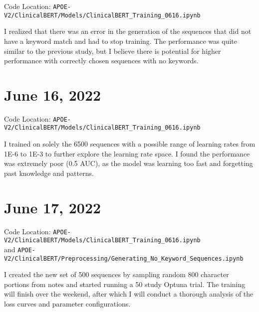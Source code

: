 \documentclass[11pt,letterpaper]{article}
\begin{document}
Code Location: \texttt{APOE-V2/ClinicalBERT/Models/ClinicalBERT\_Training\_0616.ipynb}

I realized that there was an error in the generation of the sequences that did not have a keyword match and had to stop training. The performance was quite similar to the previous study, but I believe there is potential for higher performance with correctly chosen sequences with no keywords.

\section{June 16, 2022} 

Code Location: \texttt{APOE-V2/ClinicalBERT/Models/ClinicalBERT\_Training\_0616.ipynb}

I trained on solely the 6500 sequences with a possible range of learning rates from 1E-6 to 1E-3 to further explore the learning rate space. I found the performance was extremely poor (0.5 AUC), as the model was learning too fast and forgetting past knowledge and patterns. 

\section{June 17, 2022} 

Code Location: \texttt{APOE-V2/ClinicalBERT/Models/ClinicalBERT\_Training\_0616.ipynb} \\ and \texttt{APOE-V2/ClinicalBERT/Preprocessing/Generating\_No\_Keyword\_Sequences.ipynb}

I created the new set of 500 sequences by sampling random 800 character portions from notes and started running a 50 study Optuna trial. The training will finish over the weekend, after which I will conduct a thorough analysis of the loss curves and parameter configurations.

\clearpage

\nocite{*}
\end{document}
